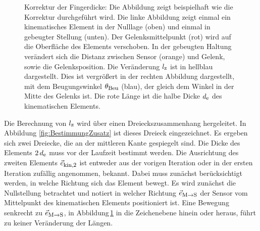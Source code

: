 \begin{figure}[h!]
    \centering
    \caption{Korrektur der Fingerdicke: Die Abbildung zeigt beispielhaft wie die Korrektur durchgeführt wird. Die linke Abbildung zeigt einmal ein kinematisches Element in der Nulllage (oben) und einmal in gebeugter Stellung (unten). Der Gelenksmittelpunkt (rot) wird auf die Oberfläche des Elements verschoben. In der gebeugten Haltung verändert sich die Distanz zwischen Sensor (orange) und Gelenk, sowie die Gelenksposition. Die Veränderung $l_{\textrm{\footnotesize{z}}}$ ist in hellblau dargestellt. Dies ist vergrößert in der rechten Abbildung dargestellt, mit dem Beugungswinkel $\theta_{\textrm{\footnotesize{Beu}}}$ (blau), der gleich dem Winkel in der Mitte des Gelenks ist. Die rote Länge ist die halbe Dicke $d_{\textrm{\footnotesize{e}}}$ des kinematischen Elements.}
    \label{fig:KorrDicke}
\end{figure}

Die Berechnung von $l_{\textrm{\footnotesize{z}}}$ wird über einen Dreieckszusammenhang hergeleitet. In Abbildung \ref{fig:BestimmungZusatz} ist dieses Dreieck eingezeichnet. Es ergeben sich zwei Dreiecke, die an der mittleren Kante gespiegelt sind. Die Dicke des Elements $2\,d_{\textrm{\footnotesize{e}}}$ muss vor der Laufzeit bestimmt werden. Die Ausrichtung des zweiten Elements $\vec{e}_{\textrm{\footnotesize{kin,2}}}$ ist entweder aus der vorigen Iteration oder in der ersten Iteration zufällig angenommen, bekannt. Dabei muss zunächst berücksichtigt werden, in welche Richtung sich das Element bewegt. 
Es wird zunächst die Nullstellung betrachtet und notiert in welcher Richtung $\vec{e}_{\textrm{\footnotesize{M${\rightarrow}$S}}}$ der Sensor vom Mittelpunkt des kinematischen Elements positioniert ist. Eine Bewegung senkrecht zu $\vec{e}_{\textrm{\footnotesize{M${\rightarrow}$S}}}$, in Abbildung\,\ref{fig:KorrDicke} in die Zeichenebene hinein oder heraus, führt zu keiner Veränderung der Längen.

